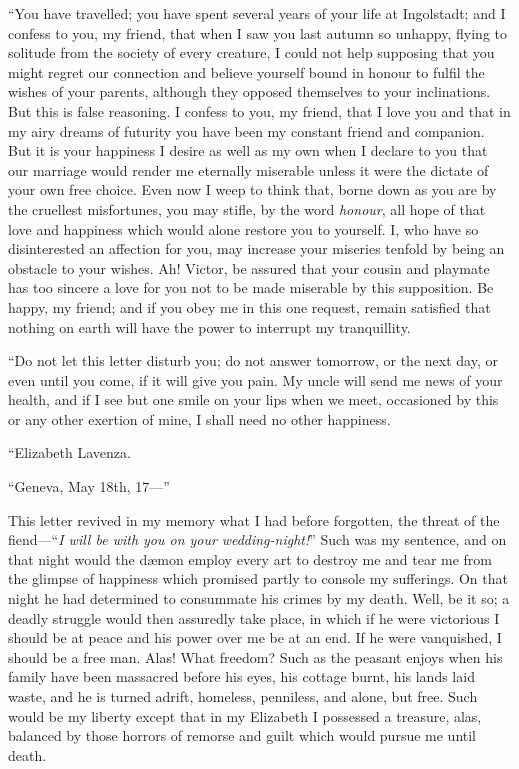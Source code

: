\documentclass[12pt,openright]{book}
\begin{document}
“You have travelled; you have spent several years of your life at Ingolstadt; and I confess to you, my friend, that when I saw you last autumn so unhappy, flying to solitude from the society of every creature, I could not help supposing that you might regret our connection and believe yourself bound in honour to fulfil the wishes of your parents, although they opposed themselves to your inclinations. But this is false reasoning. I confess to you, my friend, that I love you and that in my airy dreams of futurity you have been my constant friend and companion. But it is your happiness I desire as well as my own when I declare to you that our marriage would render me eternally miserable unless it were the dictate of your own free choice. Even now I weep to think that, borne down as you are by the cruellest misfortunes, you may stifle, by the word \textit{honour}, all hope of that love and happiness which would alone restore you to yourself. I, who have so disinterested an affection for you, may increase your miseries tenfold by being an obstacle to your wishes. Ah! Victor, be assured that your cousin and playmate has too sincere a love for you not to be made miserable by this supposition. Be happy, my friend; and if you obey me in this one request, remain satisfied that nothing on earth will have the power to interrupt my tranquillity.

“Do not let this letter disturb you; do not answer tomorrow, or the next day, or even until you come, if it will give you pain. My uncle will send me news of your health, and if I see but one smile on your lips when we meet, occasioned by this or any other exertion of mine, I shall need no other happiness.

“Elizabeth Lavenza.

“Geneva, May 18th, 17—”

This letter revived in my memory what I had before forgotten, the threat of the fiend—“\textit{I will be with you on your}\textit{ }\textit{wedding-night!}” Such was my sentence, and on that night would the dæmon employ every art to destroy me and tear me from the glimpse of happiness which promised partly to console my sufferings. On that night he had determined to consummate his crimes by my death. Well, be it so; a deadly struggle would then assuredly take place, in which if he were victorious I should be at peace and his power over me be at an end. If he were vanquished, I should be a free man. Alas! What freedom? Such as the peasant enjoys when his family have been massacred before his eyes, his cottage burnt, his lands laid waste, and he is turned adrift, homeless, penniless, and alone, but free. Such would be my liberty except that in my Elizabeth I possessed a treasure, alas, balanced by those horrors of remorse and guilt which would pursue me until death.
\end{document}
